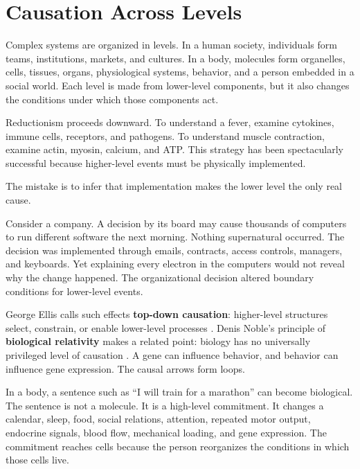 \chapter{Causation Across Levels}\label{chapter-3-causation-across-levels}

Complex systems are organized in levels. In a human society, individuals form teams, institutions, markets, and cultures. In a body, molecules form organelles, cells, tissues, organs, physiological systems, behavior, and a person embedded in a social world. Each level is made from lower-level components, but it also changes the conditions under which those components act.

Reductionism proceeds downward. To understand a fever, examine cytokines, immune cells, receptors, and pathogens. To understand muscle contraction, examine actin, myosin, calcium, and ATP. This strategy has been spectacularly successful because higher-level events must be physically implemented.

The mistake is to infer that implementation makes the lower level the only real cause.

Consider a company. A decision by its board may cause thousands of computers to run different software the next morning. Nothing supernatural occurred. The decision was implemented through emails, contracts, access controls, managers, and keyboards. Yet explaining every electron in the computers would not reveal why the change happened. The organizational decision altered boundary conditions for lower-level events.

George Ellis calls such effects \textbf{top-down causation}: higher-level structures select, constrain, or enable lower-level processes \autocite{ellis2012topdown}. Denis Noble's principle of \textbf{biological relativity} makes a related point: biology has no universally privileged level of causation \autocite{noble2012biological}. A gene can influence behavior, and behavior can influence gene expression. The causal arrows form loops.

In a body, a sentence such as ``I will train for a marathon'' can become biological. The sentence is not a molecule. It is a high-level commitment. It changes a calendar, sleep, food, social relations, attention, repeated motor output, endocrine signals, blood flow, mechanical loading, and gene expression. The commitment reaches cells because the person reorganizes the conditions in which those cells live.

